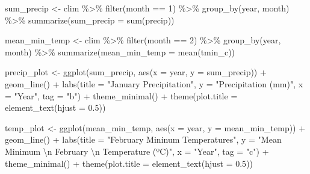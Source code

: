 \documentclass[
]{article}
\newenvironment{Shaded}{\begin{snugshade}}{\end{snugshade}}
\newcommand{\AttributeTok}[1]{\textcolor[rgb]{0.77,0.63,0.00}{#1}}
\newcommand{\DecValTok}[1]{\textcolor[rgb]{0.00,0.00,0.81}{#1}}
\newcommand{\FloatTok}[1]{\textcolor[rgb]{0.00,0.00,0.81}{#1}}
\newcommand{\FunctionTok}[1]{\textcolor[rgb]{0.00,0.00,0.00}{#1}}
\newcommand{\NormalTok}[1]{#1}
\newcommand{\OtherTok}[1]{\textcolor[rgb]{0.56,0.35,0.01}{#1}}
\newcommand{\SpecialCharTok}[1]{\textcolor[rgb]{0.00,0.00,0.00}{#1}}
\newcommand{\StringTok}[1]{\textcolor[rgb]{0.31,0.60,0.02}{#1}}
\begin{document}
\begin{Shaded}
\begin{Highlighting}[]
\NormalTok{sum\_precip }\OtherTok{\textless{}{-}}\NormalTok{ clim }\SpecialCharTok{\%\textgreater{}\%} 
  \FunctionTok{filter}\NormalTok{(month }\SpecialCharTok{==} \DecValTok{1}\NormalTok{) }\SpecialCharTok{\%\textgreater{}\%} 
  \FunctionTok{group\_by}\NormalTok{(year, month) }\SpecialCharTok{\%\textgreater{}\%} 
  \FunctionTok{summarize}\NormalTok{(}\AttributeTok{sum\_precip =} \FunctionTok{sum}\NormalTok{(precip))}

\NormalTok{mean\_min\_temp }\OtherTok{\textless{}{-}}\NormalTok{ clim }\SpecialCharTok{\%\textgreater{}\%} 
  \FunctionTok{filter}\NormalTok{(month }\SpecialCharTok{==} \DecValTok{2}\NormalTok{) }\SpecialCharTok{\%\textgreater{}\%} 
  \FunctionTok{group\_by}\NormalTok{(year, month) }\SpecialCharTok{\%\textgreater{}\%} 
  \FunctionTok{summarize}\NormalTok{(}\AttributeTok{mean\_min\_temp =} \FunctionTok{mean}\NormalTok{(tmin\_c))}
\end{Highlighting}
\end{Shaded}

\begin{Shaded}
\begin{Highlighting}[]
\NormalTok{precip\_plot }\OtherTok{\textless{}{-}} \FunctionTok{ggplot}\NormalTok{(sum\_precip, }\FunctionTok{aes}\NormalTok{(}\AttributeTok{x =}\NormalTok{ year, }\AttributeTok{y =}\NormalTok{ sum\_precip)) }\SpecialCharTok{+}
  \FunctionTok{geom\_line}\NormalTok{() }\SpecialCharTok{+}
  \FunctionTok{labs}\NormalTok{(}\AttributeTok{title =} \StringTok{"January Precipitation"}\NormalTok{, }\AttributeTok{y =} \StringTok{"Precipitation (mm)"}\NormalTok{, }\AttributeTok{x =} \StringTok{"Year"}\NormalTok{, }\AttributeTok{tag =} \StringTok{"b"}\NormalTok{) }\SpecialCharTok{+}
  \FunctionTok{theme\_minimal}\NormalTok{() }\SpecialCharTok{+}
  \FunctionTok{theme}\NormalTok{(}\AttributeTok{plot.title =} \FunctionTok{element\_text}\NormalTok{(}\AttributeTok{hjust =} \FloatTok{0.5}\NormalTok{))}

\NormalTok{temp\_plot }\OtherTok{\textless{}{-}} \FunctionTok{ggplot}\NormalTok{(mean\_min\_temp, }\FunctionTok{aes}\NormalTok{(}\AttributeTok{x =}\NormalTok{ year, }\AttributeTok{y =}\NormalTok{ mean\_min\_temp)) }\SpecialCharTok{+}
  \FunctionTok{geom\_line}\NormalTok{() }\SpecialCharTok{+}
  \FunctionTok{labs}\NormalTok{(}\AttributeTok{title =} \StringTok{"February Mininum Temperatures"}\NormalTok{, }\AttributeTok{y =} \StringTok{"Mean Minimum }\SpecialCharTok{\textbackslash{}n}\StringTok{ February }\SpecialCharTok{\textbackslash{}n}\StringTok{ Temperature (ºC)"}\NormalTok{, }\AttributeTok{x =} \StringTok{"Year"}\NormalTok{, }\AttributeTok{tag =} \StringTok{"c"}\NormalTok{) }\SpecialCharTok{+}
  \FunctionTok{theme\_minimal}\NormalTok{() }\SpecialCharTok{+}
  \FunctionTok{theme}\NormalTok{(}\AttributeTok{plot.title =} \FunctionTok{element\_text}\NormalTok{(}\AttributeTok{hjust =} \FloatTok{0.5}\NormalTok{))}
\end{Highlighting}
\end{Shaded}
\end{document}
